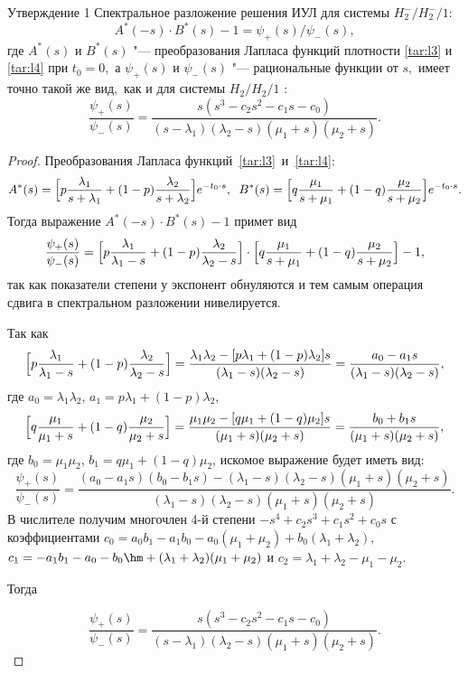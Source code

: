 \smallskip

\hypertarget{taras:utv1}{}

\begin{newthm}{Утверждение 1} Спектральное разложение решения ИУЛ для системы $H_2^-/H_2^-/1{:}$ 
$$
A^*(-s)\cdot B^*(s)-1=\psi_+(s)/\psi_-(s),
$$  
где $A^*(s)$ и $B^*(s)$ "--- преобразования Лапласа функций плотности \eqref{tar:l3} и \eqref{tar:l4} при $t_0=0,$ а $\psi_+(s)$  и $\psi_-(s)$ "--- рациональные функции от $s,$ имеет точно такой же вид$,$ как и для системы $H_2/H_2/1$ {\rm \cite{tar:tarasov_2}:} 
$$\frac{\psi_+(s)}{\psi_-(s)}=\frac{s(s^3-c_2s^2-c_1s-c_0)}{(s-\lambda_1)(\lambda_2-s)(\mu_1+s)(\mu_2+s)}.$$ 
\end{newthm}

\smallskip

\begin{proof} Преобразования Лапласа \mbox{функций \eqref{tar:l3} и \eqref{tar:l4}:}
$$
A^*(s)=\Bigl[p\frac{\lambda_1}{s+\lambda_1}+(1-p)\frac{\lambda_2}{s+\lambda_2}\Bigr] e^{-t_0\cdot s},
\;\;
B^*(s)=\Bigl[q\frac{\mu_1}{s+\mu_1}+(1-q)\frac{\mu_2}{s+\mu_2}\Bigr] e^{-t_0\cdot s}.
$$ 
Тогда выражение $A^*(-s)\cdot B^*(s)-1$ примет вид 
$$
\frac{\psi_+(s)}{\psi_-(s)}=
\Bigl[p\frac{\lambda_1}{\lambda_1-s}+(1-p)\frac{\lambda_2}{\lambda_2-s}\Bigr]\cdot
\Bigl[q\frac{\mu_1}{s+\mu_1}+(1-q)\frac{\mu_2}{s+\mu_2}\Bigr]-1,
$$ 
так как показатели степени у экспонент обнуляются и тем самым операция сдвига в спектральном разложении нивелируется.

Так как
$$
\Bigl[p\frac{\lambda_1}{\lambda_1-s}+(1-p)\frac{\lambda_2}{\lambda_2-s}\Bigr]=
\frac{\lambda_1\lambda_2-[p\lambda_1+(1-p)\lambda_2]s}{(\lambda_1-s)(\lambda_2-s)}=\frac{a_0-a_1s}{(\lambda_1-s)(\lambda_2-s)},
$$
где $a_0=\lambda_1\lambda_2$, $a_1=p\lambda_1+(1-p)\lambda_2$,
$$
\Bigl[q\frac{\mu_1}{\mu_1+s}+(1-q)\frac{\mu_2}{\mu_2+s}\Bigr]=\frac{\mu_1\mu_2-[q\mu_1+(1-q)\mu_2]s}{(\mu_1+s)(\mu_2+s)}=\frac{b_0+b_1s}{(\mu_1+s)(\mu_2+s)},
$$
где $b_0=\mu_1\mu_2$, $b_1=q\mu_1+(1-q)\mu_2$,
искомое выражение будет иметь вид:
$$
\frac{\psi_+(s)}{\psi_-(s)}=\frac{(a_0-a_1s)(b_0-b_1s)-(\lambda_1-s)(\lambda_2-s)(\mu_1+s)(\mu_2+s)}{(\lambda_1-s)(\lambda_2-s)(\mu_1+s)(\mu_2+s)}.
$$
 В числителе получим многочлен 4-й степени $-s^4+c_2s^3+c_1s^2+c_0s$ с коэффициентами 
 $c_0=a_0b_1-a_1b_0-a_0(\mu_1+\mu_2)+b_0(\lambda_1+\lambda_2),$ $c_1=-a_1b_1-a_0-b_0 \hm +(\lambda_1+\lambda_2)(\mu_1+\mu_2)$ и $c_2=\lambda_1+\lambda_2-\mu_1-\mu_2$.

Тогда  

\begin{equation}
\label{tar:l11}
\frac{\psi_+(s)}{\psi_-(s)}=\frac{s(s^3-c_2s^2-c_1s-c_0)}{(s-\lambda_1)(\lambda_2-s)(\mu_1+s)(\mu_2+s)}.
\end{equation}


\end{proof}
